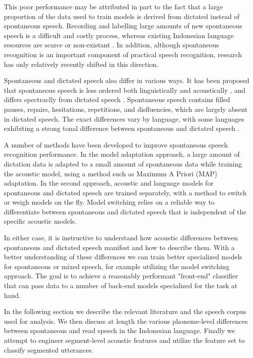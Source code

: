 \documentclass[conference]{IEEEtran}
\begin{document}
This poor performance may be attributed in part to the fact that a large proportion of the data used to train models is derived from dictated instead of spontaneous speech.
Recording and labelling large amounts of new spontaneous speech is a difficult and costly process, whereas existing Indonesian language resources are scarce or non-existant \cite{hoesen}.
In addition, although spontaneous recognition is an important component of practical speech recognition, research has only relatively recently shifted in this direction.

Spontaneous and dictated speech also differ in various ways.
It has been proposed that spontaneous speech is less ordered both linguistically and acoustically \cite{furui2}, and differs spectraclly from dictated speech \cite{nakamura}.
Spontaneous speech contains filled pauses, repairs, hesitations, repetitions, and disfluencies, which are largely absent in dictated speech.
The exact differences vary by language, with some languages exhibiting a strong tonal difference between spontaneous and dictated speech \cite{dellwo}.

A number of methods have been developed to improve spontaneous speech recognition performance.
In the model adaptation approach, a large amount of dictation data is adapted to a small amount of spontaneous data while training the acoustic model, using a method such as Maximum A Priori (MAP) adaptation.
In the second approach, acoustic and language models for spontaneous and dictated speech are trained separately, with a method to switch or weigh models on the fly.
Model switching relies on a reliable way to differentiate between spontaneous and dictated speech that is independent of the specific acoustic models.

In either case, it is instructive to understand how acoustic differences between spontaneous and dictated speech manifest and how to describe them.
With a better understanding of these differences we can train better specialized models for spontaneous or mixed speech, for example utilizing the model switching approach.
The goal is to achieve a reasonably performant "front-end" classifier that can pass data to a number of back-end models specialized for the task at hand.

In the following section we describe the relevant literature and the speech corpus used for analysis.
We then discuss at length the various phoneme-level differences between spontaneous and read speech in the Indonesian language.
Finally we attempt to engineer segment-level acoustic features and utilize the feature set to classify segmented utterances.
\end{document}
